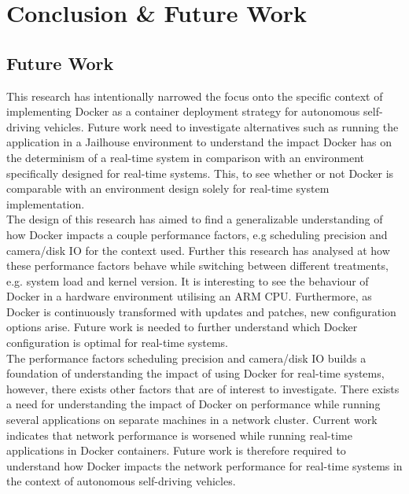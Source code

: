 \iffalse  \fi
\chapter{Conclusion \& Future Work}


\section{Future Work}

This research has intentionally narrowed the focus onto the specific context of implementing Docker as a container deployment strategy for autonomous self-driving vehicles. Future work need to investigate alternatives such as running the application in a Jailhouse environment to understand the impact Docker has on the determinism of a real-time system in comparison with an environment specifically designed for real-time systems. This, to see whether or not Docker is comparable with an environment design solely for real-time system implementation.\\

The design of this research has aimed to find a generalizable understanding of how Docker impacts a couple performance factors, e.g scheduling precision and camera/disk IO for the context used. Further this research has analysed at how these performance factors behave while switching between different treatments, e.g. system load and kernel version. It is interesting to see the behaviour of Docker in a hardware environment utilising an ARM CPU. Furthermore, as Docker is continuously transformed with updates and patches, new configuration options arise. Future work is needed to further understand which Docker configuration is optimal for real-time systems.\\

The performance factors scheduling precision and camera/disk IO builds a foundation of understanding the impact of using Docker for real-time systems, however, there exists other factors that are of interest to investigate. There exists a need for understanding the impact of Docker on performance while running several applications on separate machines in a network cluster. Current work \cite{conf/cloudcom/MaoHPWCCH15} indicates that network performance is worsened while running real-time applications in Docker containers. Future work is therefore required to understand how Docker impacts the network performance for real-time systems in the context of autonomous self-driving vehicles.\\



